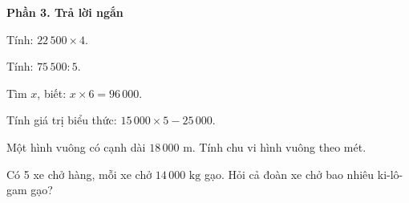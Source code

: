 \textbf{Phần 3. Trả lời ngắn}

\begin{ex} %
Tính: $22\,500 \times 4$.
\end{ex}

\begin{ex} %
Tính: $75\,500 : 5$.
\end{ex}

\begin{ex} %
Tìm $x$, biết: $x \times 6 = 96\,000$.
\end{ex}

\begin{ex} %
Tính giá trị biểu thức: $15\,000 \times 5 - 25\,000$.
\end{ex}

\begin{ex} %
Một hình vuông có cạnh dài $18\,000\text{ m}$. Tính chu vi hình vuông theo mét.
\end{ex}

\begin{ex} %
Có 5 xe chở hàng, mỗi xe chở $14\,000\text{ kg}$ gạo. Hỏi cả đoàn xe chở bao nhiêu ki-lô-gam gạo?
\end{ex}
